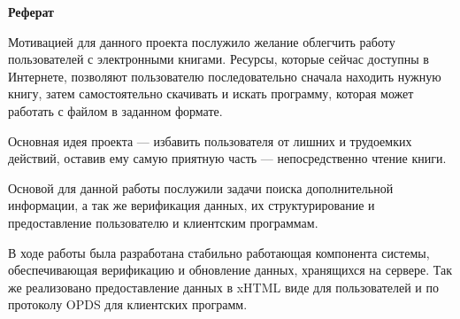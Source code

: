 
\begin{center}
\textbf{Реферат}
\end{center}


Мотивацией для данного проекта послужило желание облегчить работу пользователей с электронными книгами. Ресурсы, которые сейчас доступны в Интернете, позволяют пользователю последовательно сначала находить нужную книгу, затем самостоятельно скачивать и искать программу, которая может работать с файлом в заданном формате.

Основная идея проекта --- избавить пользователя от лишних и трудоемких действий, оставив ему самую приятную часть --- непосредственно чтение книги. 

Основой для данной работы послужили задачи поиска дополнительной информации, а так же верификация данных, их структурирование и предоставление пользователю и клиентским программам.

В ходе работы была разработана стабильно работающая компонента системы, обеспечивающая верификацию и обновление данных, хранящихся на сервере. Так же реализовано предоставление данных в xHTML виде для пользователей и по протоколу OPDS для клиентских программ. 


\newpage
